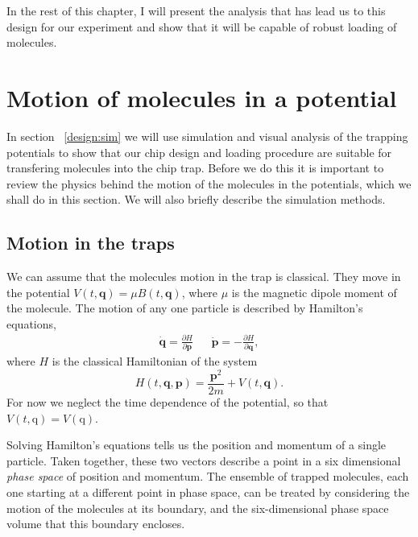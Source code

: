 In the rest of this chapter, I will present the analysis that has lead us to
this design for our experiment and show that it will be capable of robust
loading of \CaF{} molecules.

\section{Motion of molecules in a potential}

In section ~\ref{design:sim} we will use simulation and visual analysis of the
trapping potentials to show that our chip design and loading procedure are
suitable for transfering molecules into the chip trap. Before we do this it is
important to review the physics behind the motion of the molecules in the
potentials, which we shall do in this section. We will also briefly describe
the simulation methods.

\subsection{Motion in the traps}
\label{desgin:motion}

We can assume that the molecules motion in the trap is classical. They move in
the potential $V(t, \mathbf{q}) = \mu B(t, \mathbf{q})$, where $\mu$ is the
magnetic dipole moment of the molecule.  The motion of any one particle is
described by Hamilton's equations,~\cite{Lichtenberg1969}
%
\begin{align}
  \label{design:eq:hamilton}
  \dot{\mathbf{q}} =  \frac{\partial H}{\partial \mathbf{p}} &&
  \dot{\mathbf{p}} = -\frac{\partial H}{\partial \mathbf{q}},
\end{align}
%
where $H$ is the classical Hamiltonian of the system
\begin{equation}
  H(t, \mathbf{q}, \mathbf{p}) = \frac{\mathbf{p}^2}{2m} + V(t, \mathbf{q}).
\end{equation}
For now we neglect the time dependence of the potential, so that $V(t,
\mathrm{q}) = V(\mathrm{q})$.

Solving Hamilton's equations tells us the position and momentum of a single
particle. Taken together, these two vectors describe a point in a six
dimensional \emph{phase space} of position and momentum. The ensemble of
trapped molecules, each one starting at a different point in phase space, can
be treated by considering the motion of the molecules at its
boundary, and the  six-dimensional phase space volume that this
boundary encloses.~\cite{Hand1998}

